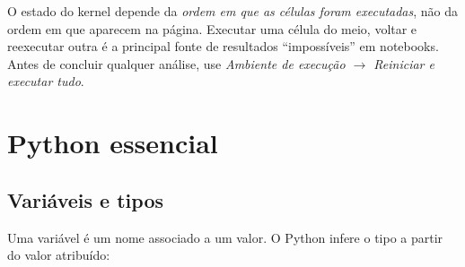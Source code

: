 \begin{atencao}
O estado do kernel depende da \emph{ordem em que as células foram executadas},
não da ordem em que aparecem na página. Executar uma célula do meio, voltar e
reexecutar outra é a principal fonte de resultados ``impossíveis'' em
notebooks. Antes de concluir qualquer análise, use \emph{Ambiente de execução
$\to$ Reiniciar e executar tudo}.
\end{atencao}

\section{Python essencial}

\subsection{Variáveis e tipos}

Uma variável é um nome associado a um valor. O Python infere o tipo a partir
do valor atribuído:



